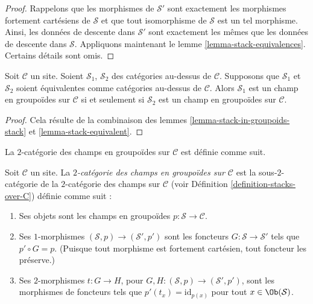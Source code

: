 \begin{proof}
Rappelons que les morphismes de $\mathcal{S}'$ sont exactement les
morphismes fortement cartésiens de $\mathcal{S}$ et que tout isomorphisme de
$\mathcal{S}$ est un tel morphisme. Ainsi, les données de descente dans $\mathcal{S}'$
sont exactement les mêmes que les données de descente dans $\mathcal{S}$. Appliquons maintenant le
lemme \ref{lemma-stack-equivalences}. Certains détails sont omis.
\end{proof}

\begin{lemma}
\label{lemma-stack-in-groupoids-equivalent}
Soit $\mathcal{C}$ un site.
Soient $\mathcal{S}_1$, $\mathcal{S}_2$ des catégories au-dessus de $\mathcal{C}$.
Supposons que $\mathcal{S}_1$ et $\mathcal{S}_2$ soient équivalentes
comme catégories au-dessus de $\mathcal{C}$.
Alors $\mathcal{S}_1$ est un champ en groupoïdes sur $\mathcal{C}$ si et seulement si
$\mathcal{S}_2$ est un champ en groupoïdes sur $\mathcal{C}$.
\end{lemma}

\begin{proof}
Cela résulte de la combinaison des
lemmes \ref{lemma-stack-in-groupoids-stack} et \ref{lemma-stack-equivalent}.
\end{proof}

\noindent
La $2$-catégorie des champs en groupoïdes sur $\mathcal{C}$
est définie comme suit.

\begin{definition}
\label{definition-stacks-in-groupoids-over-C}
Soit $\mathcal{C}$ un site.
La {\it $2$-catégorie des champs en groupoïdes sur $\mathcal{C}$}
est la sous-$2$-catégorie de la $2$-catégorie des champs
sur $\mathcal{C}$ (voir Définition \ref{definition-stacks-over-C})
définie comme suit :
\begin{enumerate}
\item Ses objets sont les champs en groupoïdes
$p : \mathcal{S} \to \mathcal{C}$.
\item Ses $1$-morphismes $(\mathcal{S}, p) \to (\mathcal{S}', p')$
sont les foncteurs $G : \mathcal{S} \to \mathcal{S}'$ tels que
$p' \circ G = p$. (Puisque tout morphisme est fortement cartésien,
tout foncteur les préserve.)
\item Ses $2$-morphismes $t : G \to H$, pour
$G, H : (\mathcal{S}, p) \to (\mathcal{S}', p')$,
sont les morphismes de foncteurs
tels que $p'(t_x) = \text{id}_{p(x)}$
pour tout $x \in \Ob(\mathcal{S})$.
\end{enumerate}
\end{definition}

